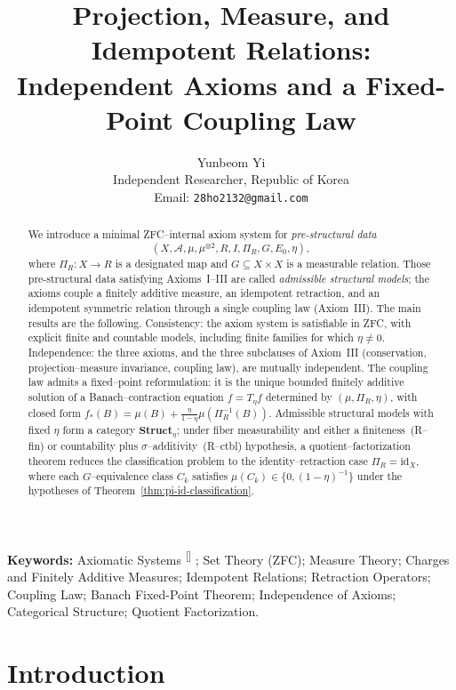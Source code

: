 \documentclass[11pt]{article}
\title{\textbf{Projection, Measure, and Idempotent Relations:\\
Independent Axioms and a Fixed-Point Coupling Law}}
\author{
Yunbeom Yi\\[4pt]
\small Independent Researcher, Republic of Korea\\
\small Email: \texttt{28ho2132@gmail.com}
}
\date{}
\newcounter{ReviewerNoteCount}
\newcommand{\reviewer}[2]{%
    \stepcounter{ReviewerNoteCount}%
    {\color{blue}#1}%
    \textsuperscript{\color{blue}[\theReviewerNoteCount]}%
    \marginpar{\linespread{1.1}\selectfont\color{red}\scriptsize\raggedright\textbf{[\theReviewerNoteCount]} #2}%
}
\numberwithin{equation}{section}
\theoremstyle{definition}
\begin{document}
\maketitle

\begin{abstract}
We introduce a minimal ZFC--internal axiom system for \emph{pre-structural data}
\[
(X,\mathcal A,\mu,\mu^{\otimes2},R,I,\Pi_R,G,E_0,\eta),
\]
where $\Pi_R:X\to R$ is a designated map and $G\subseteq X\times X$ is a measurable relation. Those pre-structural data satisfying Axioms~I--III are called \emph{admissible structural models}; the axioms couple a finitely additive measure, an idempotent retraction, and an idempotent symmetric relation through a single coupling law (Axiom~III). The main results are the following. Consistency: the axiom system is satisfiable in ZFC, with explicit finite and countable models, including finite families for which $\eta\neq 0$. Independence: the three axioms, and the three subclauses of Axiom~III (conservation, projection--measure invariance, coupling law), are mutually independent. The coupling law admits a fixed--point reformulation: it is the unique bounded finitely additive solution of a Banach--contraction equation $f=T_\eta f$ determined by $(\mu,\Pi_R,\eta)$, with closed form $f_*(B)=\mu(B)+\tfrac{\eta}{1-\eta}\mu(\Pi_R^{-1}(B))$. Admissible structural models with fixed $\eta$ form a category $\mathbf{Struct}_\eta$; under fiber measurability and either a finiteness~(R--fin) or countability plus $\sigma$--additivity~(R--ctbl) hypothesis, a quotient--factorization theorem reduces the classification problem to the identity--retraction case $\Pi_R=\mathrm{id}_X$, where each $G$--equivalence class $C_k$ satisfies $\mu(C_k)\in\{0,(1-\eta)^{-1}\}$ under the hypotheses of Theorem~\ref{thm:pi-id-classification}.
\end{abstract}

\bigskip

\noindent\textbf{Keywords:}
\reviewer{Axiomatic Systems}{This is an example}; Set Theory (ZFC); Measure Theory; Charges and Finitely Additive Measures; Idempotent Relations; Retraction Operators; Coupling Law; Banach Fixed-Point Theorem; Independence of Axioms; Categorical Structure; Quotient Factorization.


\section{Introduction}
\end{document}
